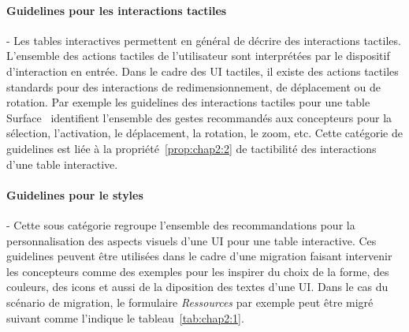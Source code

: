 \paragraph{Guidelines pour les interactions tactiles}-
Les tables interactives permettent en général de décrire des interactions tactiles. L'ensemble des actions tactiles de l'utilisateur sont interprétées par le dispositif d'interaction en entrée. Dans le cadre des UI tactiles, il existe des actions tactiles standards pour des interactions de redimensionnement, de déplacement ou de rotation. Par exemple les guidelines des interactions tactiles pour une table Surface~\cite{Microsoft2011} identifient l'ensemble des gestes recommandés aux concepteurs pour la sélection, l'activation, le déplacement, la rotation, le zoom, etc. Cette catégorie de guidelines est liée à la propriété~\ref{prop:chap2:2} de tactibilité des interactions d'une table interactive.


\paragraph{Guidelines pour le styles } - 
Cette sous catégorie regroupe l'ensemble des recommandations pour la personnalisation des aspects visuels d'une UI pour une table interactive. 
Ces guidelines peuvent être utilisées dans le cadre d'une migration faisant intervenir les concepteurs comme des exemples pour les inspirer du choix de la forme, des couleurs, des icons et aussi de la diposition des textes d'une UI.
Dans le cas du scénario de migration, le formulaire \textit{Ressources} par exemple peut être migré suivant comme l'indique le tableau~\ref{tab:chap2:1}. 

